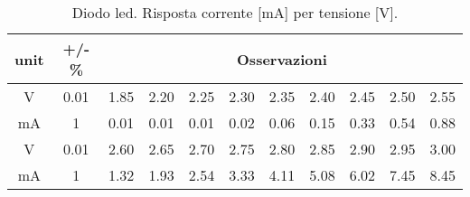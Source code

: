 \begin{table}[H]
\begin{center}
\begin{tabular}{|c|c|c c c c c c c c c|}
    \hline
    unit & +/- \% & \multicolumn{9}{c|}{Osservazioni}\\ 
    \hline
    V & 0.01 & 1.85 & 2.20 & 2.25 & 2.30 & 2.35 & 2.40 & 2.45 & 2.50 & 2.55 \\ 
    mA & 1 & 0.01 & 0.01 & 0.01 & 0.02 & 0.06 & 0.15 & 0.33 & 0.54 & 0.88 \\ 
    \hline
    V & 0.01 & 2.60 & 2.65 & 2.70 & 2.75 & 2.80 & 2.85 & 2.90 & 2.95 & 3.00 \\ 
    mA & 1 & 1.32 & 1.93 & 2.54 & 3.33 & 4.11 & 5.08 & 6.02 & 7.45 & 8.45 \\ \hline
    \end{tabular}
    \end{center}
    \caption{Diodo led. Risposta corrente [mA] per tensione [V].}
    \label{C1_P3_dati}
\end{table}

